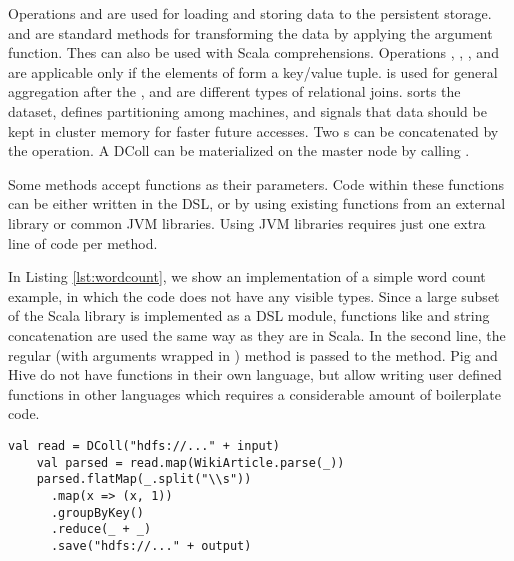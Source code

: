 Operations  and  are used for loading and storing data
to the persistent storage.  and  are standard
methods for transforming the data by applying the argument function. Thes can
also be used with Scala  comprehensions. Operations
, , ,  and 
are applicable only if the elements of  form a key/value tuple.
 is used for general aggregation after the ,
 and  are different types of relational joins.
 sorts the dataset,  defines partitioning among
machines, and  signals that data should be kept in cluster memory
for faster future accesses. Two s can be concatenated by the
\code{++} operation. A DColl can be materialized on the master node by calling
.

Some methods accept functions as their parameters. Code within these functions
can be either written in the \tool DSL, or by using existing functions from an
external library or common JVM libraries. Using JVM libraries requires just one
extra line of code per method.

In Listing \ref{lst:wordcount}, we show an implementation of a simple word count
example, in which the code does not have any visible  types. Since a
large subset of the Scala library is implemented as a DSL module, functions like
 and string concatenation are used the same way as they are in
Scala. In the second line, the regular (with arguments wrapped in )
method  is passed to the  method. Pig and Hive do not have
functions in their own language, but allow writing user defined functions in
other languages which requires a considerable amount of boilerplate code.

\begin{lstlisting}[name=code, caption=Example of word count program where type inference removes the need to declare any \scode{Rep} types., captionpos=b, label=lst:wordcount, float=t]
    val read = DColl("hdfs://..." + input)
    val parsed = read.map(WikiArticle.parse(_))
    parsed.flatMap(_.split("\\s"))
      .map(x => (x, 1))
      .groupByKey()
      .reduce(_ + _)
      .save("hdfs://..." + output)
\end{lstlisting}

